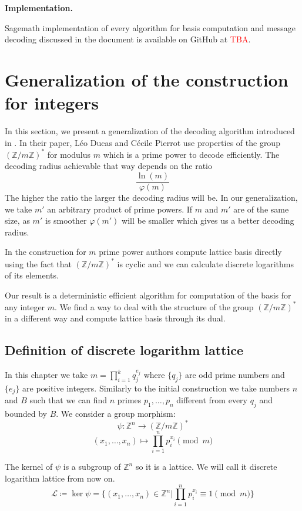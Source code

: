 \documentclass[12pt]{article}
\newcommand{\ZZ}{\mathbb{Z}}
\newcommand{\LL}{\mathcal{L}}
\begin{document}
\textbf{Implementation.}

Sagemath implementation of every algorithm for basis computation and message decoding discussed in the document is available on GitHub at \textcolor{red}{TBA}.



\section{Generalization of the construction for integers}
\label{sec:gen_integers}



In this section, we present a generalization of the decoding algorithm introduced in \cite{[DP19]}. In their paper, Léo Ducas and Cécile Pierrot use properties of the group $(\ZZ/m\ZZ)^*$ for modulus $m$ which is a prime power to decode efficiently. The decoding radius achievable that way depends on the ratio
\[
\frac{\ln(m)}{\varphi(m)}
\]
The higher the ratio the larger the decoding radius will be. In our generalization, we take $m'$ an arbitrary product of prime powers. If $m$ and $m'$ are of the same size, as $m'$ is smoother $\varphi(m')$ will be smaller which gives us a better decoding radius.

In the construction for $m$ prime power authors compute lattice basis directly using the fact that $(\ZZ/m\ZZ)^*$ is cyclic and we can calculate discrete logarithms of its elements.

Our result is a deterministic efficient algorithm for computation of the basis for any integer $m$. We find a way to deal with the structure of the group $(\ZZ/m\ZZ)^*$ in a different way and compute lattice basis through its dual.


\subsection{Definition of discrete logarithm lattice }
\label{subsec:def_integers}


In this chapter we take $m = \prod_{i=1}^{k} q_{j}^{e_{j}}$ where $\{q_{j}\}$ are odd prime numbers and $\{e_{j}\}$ are positive integers. Similarly to the initial construction we take numbers $n$ and $B$ such that we can find $n$ primes $p_{1}, \dots , p_{n}$ different from every $q_{j}$ and bounded by $B$. We consider a group morphism:
\[
    \psi : \ZZ^{n} \rightarrow (\ZZ/m\ZZ)^*
\]
\[
    (x_{1}, \dots, x_{n}) \mapsto \prod_{i=1}^{n}p_{i}^{x_{i}} \pmod{m}
\]


The kernel of $\psi$ is a subgroup of $\ZZ^{n}$ so it is a lattice. We will call it discrete logarithm lattice from now on.
\[
    \LL \coloneqq \ker \psi = \{(x_{1}, \dots, x_{n}) \in \ZZ^{n} | \prod_{i=1}^{n}p_{i}^{x_{i}} \equiv 1 \pmod{m}\}
\]
\end{document}
